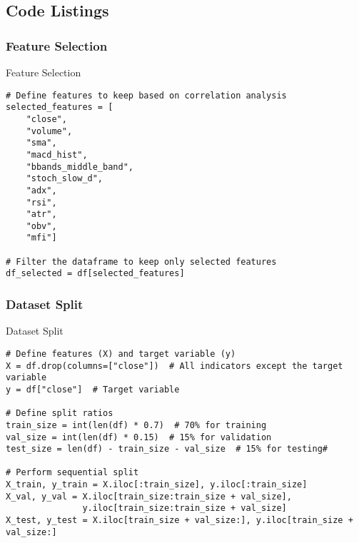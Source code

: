 \clearpage
\subsection{Code Listings}
\label{app:listings}

\subsubsection{Feature Selection}
\label{app:feat-selection}

\begin{listing}[H]
\caption{Feature Selection}
\label{lst:feat-select}
\begin{verbatim}
# Define features to keep based on correlation analysis
selected_features = [
    "close",
    "volume",
    "sma",
    "macd_hist",
    "bbands_middle_band",
    "stoch_slow_d",
    "adx", 
    "rsi",
    "atr",
    "obv",
    "mfi"]

# Filter the dataframe to keep only selected features
df_selected = df[selected_features]
\end{verbatim}
\end{listing}

\subsubsection{Dataset Split}
\label{app:dataset-split}

\begin{listing}[H]
\caption{Dataset Split}
\label{lst:dataset-split}
\begin{verbatim}
# Define features (X) and target variable (y)
X = df.drop(columns=["close"])  # All indicators except the target variable
y = df["close"]  # Target variable

# Define split ratios
train_size = int(len(df) * 0.7)  # 70% for training
val_size = int(len(df) * 0.15)  # 15% for validation
test_size = len(df) - train_size - val_size  # 15% for testing#

# Perform sequential split
X_train, y_train = X.iloc[:train_size], y.iloc[:train_size]
X_val, y_val = X.iloc[train_size:train_size + val_size], 
               y.iloc[train_size:train_size + val_size]
X_test, y_test = X.iloc[train_size + val_size:], y.iloc[train_size + val_size:]
\end{verbatim}
\end{listing}


